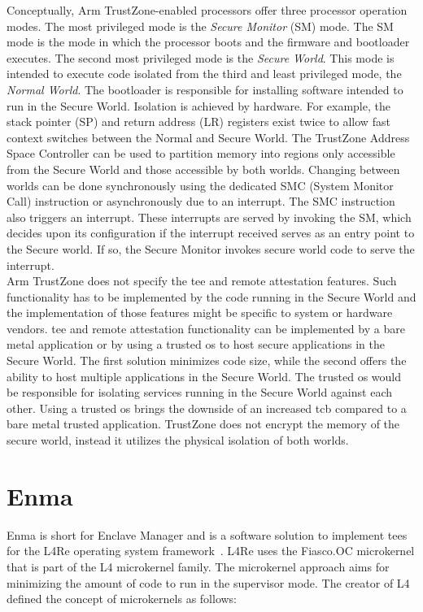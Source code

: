 Conceptually, Arm TrustZone-enabled processors offer three processor operation
modes. The most privileged mode is the \textit{Secure Monitor} (SM) mode. The SM
mode is the mode in which the processor boots and the firmware and bootloader
executes. The second most privileged mode is the \textit{Secure World}. This
mode is intended to execute code isolated from the third and least privileged
mode, the \textit{Normal World}. The bootloader is responsible for installing
software intended to run in the Secure World. Isolation is achieved by hardware.
For example, the stack pointer (SP) and return address (LR) registers exist
twice to allow fast context switches between the Normal and Secure World. The
TrustZone Address Space Controller can be used to partition memory into regions
only accessible from the Secure World and those accessible by both worlds.
Changing between worlds can be done synchronously using the dedicated SMC
(System Monitor Call) instruction or asynchronously due to an interrupt. The SMC
instruction also triggers an interrupt. These interrupts are served by invoking
the SM, which decides upon its configuration if the interrupt received serves as
an entry point to the Secure world. If so, the Secure Monitor invokes secure
world code to serve the interrupt.\\

Arm TrustZone does not specify the \gls{tee} and remote attestation features.
Such functionality has to be implemented by the code running in the Secure World
and the implementation of those features might be specific to system or
hardware vendors. \gls{tee} and remote attestation functionality can be
implemented by a bare metal application or by using a trusted \gls{os} to host
secure applications in the Secure World. The first solution minimizes code size,
while the second offers the ability to host multiple applications in the Secure
World. The trusted \gls{os} would be responsible for isolating services running
in the Secure World against each other. Using a trusted \gls{os} brings the
downside of an increased \gls{tcb} compared to a bare metal trusted application.
TrustZone does not encrypt the memory of the secure world, instead it utilizes
the physical isolation of both worlds.\\

\section{Enma}
\label{sec:20:enma}
Enma is short for Enclave Manager and is a software solution to implement
\glspl{tee} for the L4Re operating system
framework~\cite{reitz_isolierende_2019}. L4Re uses the Fiasco.OC microkernel
that is part of the L4 microkernel family. The microkernel approach aims for
minimizing the amount of code to run in the supervisor mode. The creator of L4
defined the concept of microkernels as follows:

